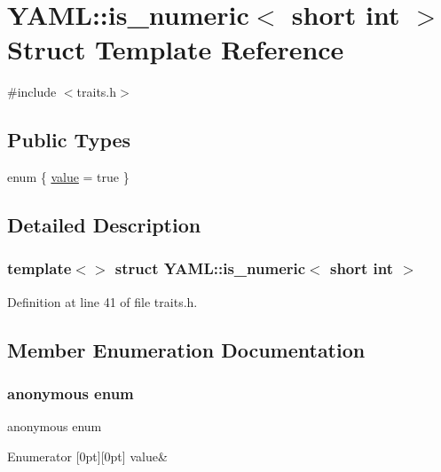 \hypertarget{struct_y_a_m_l_1_1is__numeric_3_01short_01int_01_4}{}\section{Y\+A\+ML\+::is\+\_\+numeric$<$ short int $>$ Struct Template Reference}
\label{struct_y_a_m_l_1_1is__numeric_3_01short_01int_01_4}


{\ttfamily \#include $<$traits.\+h$>$}

\subsection*{Public Types}
\begin{DoxyCompactItemize}
\item 
enum \{ \mbox{\hyperlink{struct_y_a_m_l_1_1is__numeric_3_01short_01int_01_4_afde6dc302a87c1a5bebc8209af9fa81fa36a15c36f58b5704bb9f3fa44b3d9bd5}{value}} = true
 \}
\end{DoxyCompactItemize}


\subsection{Detailed Description}
\subsubsection*{template$<$$>$\newline
struct Y\+A\+M\+L\+::is\+\_\+numeric$<$ short int $>$}



Definition at line 41 of file traits.\+h.



\subsection{Member Enumeration Documentation}
\mbox{\label{struct_y_a_m_l_1_1is__numeric_3_01short_01int_01_4_afde6dc302a87c1a5bebc8209af9fa81f}} 
\subsubsection{\texorpdfstring{anonymous enum}{anonymous enum}}
{\footnotesize\ttfamily anonymous enum}

\begin{DoxyEnumFields}{Enumerator}
[0pt][0pt]{}\mbox{\label{struct_y_a_m_l_1_1is__numeric_3_01short_01int_01_4_afde6dc302a87c1a5bebc8209af9fa81fa36a15c36f58b5704bb9f3fa44b3d9bd5}} 
value&\\
\hline

\end{DoxyEnumFields}


